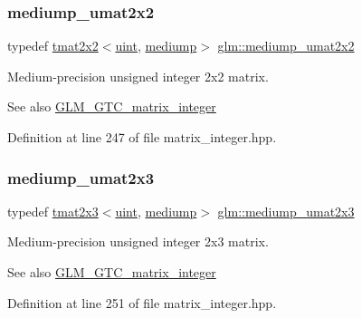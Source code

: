 \subsubsection{\texorpdfstring{mediump\_umat2x2}{mediump\_umat2x2}}
{\footnotesize\ttfamily typedef \mbox{\hyperlink{structglm_1_1tmat2x2}{tmat2x2}}$<$\mbox{\hyperlink{group__core__precision_ga4fd29415871152bfb5abd588334147c8}{uint}}, \mbox{\hyperlink{namespaceglm_a0f04f086094c747d227af4425893f545a6416f3ea0c9025fb21ed50c4d6620482}{mediump}}$>$ \mbox{\hyperlink{group__gtc__matrix__integer_gafce8777b8b0d9d7f810853b22de3be1b}{glm\+::mediump\+\_\+umat2x2}}}

Medium-\/precision unsigned integer 2x2 matrix. \begin{DoxySeeAlso}{See also}
\mbox{\hyperlink{group__gtc__matrix__integer}{G\+L\+M\+\_\+\+G\+T\+C\+\_\+matrix\+\_\+integer}} 
\end{DoxySeeAlso}


Definition at line 247 of file matrix\+\_\+integer.\+hpp.

\mbox{\label{group__gtc__matrix__integer_ga23dfc19249ad27dc4b02615f1d045ba1}} 
\subsubsection{\texorpdfstring{mediump\_umat2x3}{mediump\_umat2x3}}
{\footnotesize\ttfamily typedef \mbox{\hyperlink{structglm_1_1tmat2x3}{tmat2x3}}$<$\mbox{\hyperlink{group__core__precision_ga4fd29415871152bfb5abd588334147c8}{uint}}, \mbox{\hyperlink{namespaceglm_a0f04f086094c747d227af4425893f545a6416f3ea0c9025fb21ed50c4d6620482}{mediump}}$>$ \mbox{\hyperlink{group__gtc__matrix__integer_ga23dfc19249ad27dc4b02615f1d045ba1}{glm\+::mediump\+\_\+umat2x3}}}

Medium-\/precision unsigned integer 2x3 matrix. \begin{DoxySeeAlso}{See also}
\mbox{\hyperlink{group__gtc__matrix__integer}{G\+L\+M\+\_\+\+G\+T\+C\+\_\+matrix\+\_\+integer}} 
\end{DoxySeeAlso}


Definition at line 251 of file matrix\+\_\+integer.\+hpp.

\mbox{\label{group__gtc__matrix__integer_ga972445669c6e6652716f3f0b664b94cd}} 
